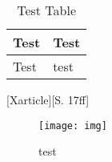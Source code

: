 \begin{table}[H]
	\caption{Test Table}
	\begin{tabular}{| l | l |}
		Test & Test\\
        \hline Test & test
	\end{tabular}
\end{table}

[Xarticle][S. 17ff]

\begin{figure}[H]
	\centering
	\caption{test}
	\texttt{[image: img]}
	\label{fig:anlagentest}
\end{figure}
